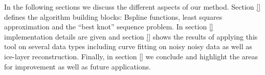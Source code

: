 \documentclass[a4paper,12pt]{article}
\begin{document}
   
   In the following sections we discuss the different aspects of our method. Section \ref{} defines 
   the algorithm building blocks: Bspline functions, 
   least squares approximation and the ``best knot'' sequence problem. 
   In section \ref{} implementation details are given and section 
   \ref{} shows the results of applying this tool on several data  types 
   including curve fitting on noisy noisy data as well as ice-layer reconstruction. 
   Finally,  in section \ref{}  we conclude and highlight the areas for improvement as well as future applications.
 
 
   
  





 
 
 

 
 
\end{document}
